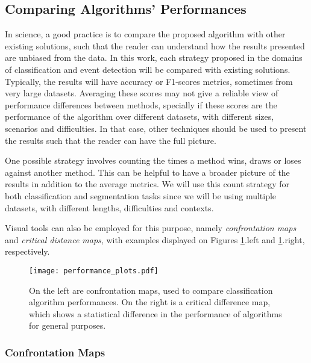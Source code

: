 \subsection{Comparing Algorithms' Performances}

In science, a good practice is to compare the proposed algorithm with other existing solutions, such that the reader can understand how the results presented are unbiased from the data. In this work, each strategy proposed in the domains of classification and event detection will be compared with existing solutions. Typically, the results will have accuracy or F1-scores metrics, sometimes from very large datasets. Averaging these scores may not give a reliable view of performance differences between methods, specially if these scores are the performance of the algorithm over different datasets, with different sizes, scenarios and difficulties. In that case, other techniques should be used to present the results such that the reader can have the full picture. 

One possible strategy involves counting the times a method wins, draws or loses against another method. This can be helpful to have a broader picture of the results in addition to the average metrics. We will use this count strategy for both classification and segmentation tasks since we will be using multiple datasets, with different lengths, difficulties and contexts. 

Visual tools can also be employed for this purpose, namely \textit{confrontation maps} and \textit{critical distance maps}, with examples displayed on Figures \ref{fig:performance_plots}.left and \ref{fig:performance_plots}.right, respectively.

\begin{figure}
\texttt{[image: performance\_plots.pdf]}
\caption{On the left are confrontation maps, used to compare classification algorithm performances. On the right is a critical difference map, which shows a statistical difference in the performance of algorithms for general purposes.}
\label{fig:performance_plots}
\end{figure}

\subsubsection{Confrontation Maps}

